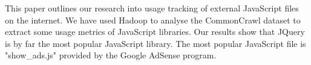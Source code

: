 This paper outlines our research into usage tracking of external JavaScript files on the internet. We have used Hadoop to analyse the CommonCrawl dataset to extract some usage metrics of JavaScript libraries. Our results show that JQuery is by far the most popular JavaScript library. The most popular JavaScript file is "show\_ads.js" provided by the Google AdSense program.